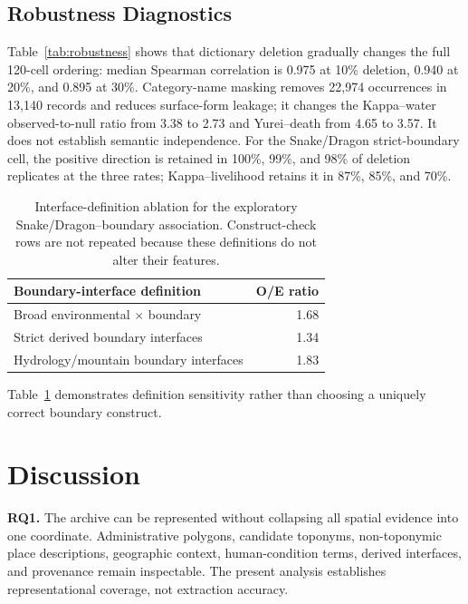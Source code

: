 \documentclass{isprs}
\begin{document}
\subsection{Robustness Diagnostics}

Table~\ref{tab:robustness} shows that dictionary deletion gradually changes the full 120-cell ordering: median Spearman correlation is 0.975 at 10\% deletion, 0.940 at 20\%, and 0.895 at 30\%. Category-name masking removes 22,974 occurrences in 13,140 records and reduces surface-form leakage; it changes the Kappa--water observed-to-null ratio from 3.38 to 2.73 and Yurei--death from 4.65 to 3.57. It does not establish semantic independence. For the Snake/Dragon strict-boundary cell, the positive direction is retained in 100\%, 99\%, and 98\% of deletion replicates at the three rates; Kappa--livelihood retains it in 87\%, 85\%, and 70\%.



\begin{table}[t]
\centering
\small
\begin{tabular}{lr}
\toprule
Boundary-interface definition & O/E ratio \\
\midrule
Broad environmental \(\times\) boundary & 1.68 \\
Strict derived boundary interfaces & 1.34 \\
Hydrology/mountain boundary interfaces & 1.83 \\
\bottomrule
\end{tabular}
\caption{Interface-definition ablation for the exploratory Snake/Dragon--boundary association. Construct-check rows are not repeated because these definitions do not alter their features.}
\label{tab:interface-ablation}
\end{table}

Table~\ref{tab:interface-ablation} demonstrates definition sensitivity rather than choosing a uniquely correct boundary construct.

\section{Discussion}

\textbf{RQ1.} The archive can be represented without collapsing all spatial evidence into one coordinate. Administrative polygons, candidate toponyms, non-toponymic place descriptions, geographic context, human-condition terms, derived interfaces, and provenance remain inspectable. The present analysis establishes representational coverage, not extraction accuracy.
\end{document}
